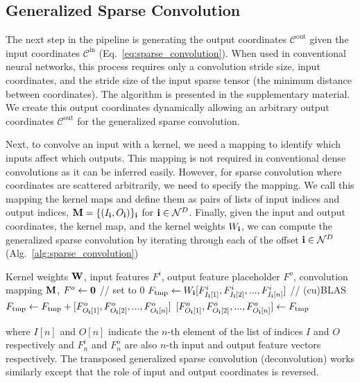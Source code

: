 \subsection{Generalized Sparse Convolution}

The next step in the pipeline is generating the output coordinates $\mathcal{C}^\text{out}$ given the input coordinates $\mathcal{C}^\text{in}$ (Eq.~\ref{eq:sparse_convolution}). When used in conventional neural networks, this process requires only a convolution stride size, input coordinates, and the stride size of the input sparse tensor (the minimum distance between coordinates). The algorithm is presented in the supplementary material. We create this output coordinates dynamically allowing an arbitrary output coordinates $\mathcal{C}^\text{out}$ for the generalized sparse convolution.

Next, to convolve an input with a kernel, we need a mapping to identify which inputs affect which outputs. This mapping is not required in conventional dense convolutions as it can be inferred easily. However, for sparse convolution where coordinates are scattered arbitrarily, we need to specify the mapping. We call this mapping the kernel maps and define them as pairs of lists of input indices and output indices, $\mathbf{M} = \{(I_{\mathbf{i}}, O_{\mathbf{i}})\}_{\mathbf{i}}$ for $\mathbf{i} \in \mathcal{N}^D$. Finally, given the input and output coordinates, the kernel map, and the kernel weights $W_{\mathbf{i}}$, we can compute the generalized sparse convolution by iterating through each of the offset $\mathbf{i} \in \mathcal{N}^D$ (Alg.~\ref{alg:sparse_convolution})
\begin{algorithm}[h]
\begin{algorithmic}[1]
\Require Kernel weights $\mathbf{W}$, input features $F^i$, output feature placeholder $F^o$, convolution mapping $\mathbf{M}$, 
\State $F^o \leftarrow \mathbf{0}$  // set to 0
    \State $F_{\text{tmp}} \leftarrow W_{\mathbf{i}} [F^i_{I_{\mathbf{i}}[1]}, F^i_{I_{\mathbf{i}}[2]}, ...,  F^i_{I_{\mathbf{i}}[n]}]$ // (cu)BLAS
    \State $F_{\text{tmp}} \leftarrow F_{\text{tmp}} + [F^o_{O_{\mathbf{i}}[1]}, F^o_{O_{\mathbf{i}}[2]}, ...,  F^o_{O_{\mathbf{i}}[n]}]$
    \State $[F^o_{O_{\mathbf{i}}[1]}, F^o_{O_{\mathbf{i}}[2]}, ...,  F^o_{O_{\mathbf{i}}[n]}] \leftarrow F_{\text{tmp}}$
\EndFor
\end{algorithmic}
\caption{Generalized Sparse Convolution}
\label{alg:sparse_convolution}
\end{algorithm}
where $I[n]$ and $O[n]$ indicate the $n$-th element of the list of indices $I$ and $O$ respectively and $F^i_n$ and $F^o_n$ are also $n$-th input and output feature vectors respectively. The transposed generalized sparse convolution (deconvolution) works similarly except that the role of input and output coordinates is reversed.


